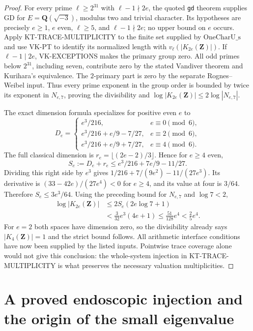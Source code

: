 \documentclass[11pt,a4paper]{article}
\theoremstyle{definition}
\begin{document}
\begin{proof}
For every prime $\ell\geq2^{31}$ with $\ell-1\nmid2e$,
the quoted \texttt{gd} theorem supplies $\mathrm{GD}$ for
$E=\mathbf Q(\sqrt{-3})$, modulus two and trivial character.
Its hypotheses are precisely $e\geq1$, $e$ even,
$\ell\geq5$, and $\ell-1\nmid2e$; no upper bound on $e$
occurs. Apply
KT-TRACE-MULTIPLICITY to the finite set supplied by
$\mathrm{OneCharU\_s}$ and use VK-PT to identify its normalized
length with $v_\ell(|K_{2e}(\mathbf Z)|)$.
If $\ell-1\mid2e$, VK-EXCEPTIONS makes the primary group zero.
All odd primes below $2^{31}$, including seven, contribute zero
by the stated Vandiver theorem and Kurihara's equivalence.
The $2$-primary part is zero by the separate Rognes--Weibel input.
Thus every prime exponent in the group order is bounded by twice
its exponent in $N_{e,7}$, proving the divisibility and
$\log|K_{2e}(\mathbf Z)|\leq2\log|N_{e,7}|$.

The exact dimension formula specializes for positive even $e$ to
\[
D_e=\begin{cases}
e^3/216,&e\equiv0\pmod6,\\
e^3/216+e/9-7/27,&e\equiv2\pmod6,\\
e^3/216+e/9+7/27,&e\equiv4\pmod6.
\end{cases}
\]
The full classical dimension is
$r_e=\lfloor(2e-2)/3\rfloor$.
Hence for $e\geq4$ even,
\[
 S_e:=D_e+r_e\leq e^3/216+7e/9-11/27.
\]
Dividing this right side by $e^3$ gives
$1/216+7/(9e^2)-11/(27e^3)$.
Its derivative is $(33-42e)/(27e^4)<0$ for $e\geq4$,
and its value at four is $3/64$. Therefore $S_e\leq3e^3/64$.
Using the preceding bound for $N_{e,7}$ and $\log7<2$,
\begin{align*}
 \log|K_{2e}(\mathbf Z)|
 &\leq 2S_e(2e\log7+1)\\
 &<\frac3{32}e^3(4e+1)
 \leq\frac{51}{128}e^4<\frac25e^4.
\end{align*}
For $e=2$ both spaces have dimension zero, so the divisibility
already says $|K_4(\mathbf Z)|=1$ and the strict bound follows.
All arithmetic interface conditions have now been supplied by
the listed inputs. Pointwise trace coverage alone would not
give this conclusion: the whole-system injection in
KT-TRACE-MULTIPLICITY is what preserves the necessary
valuation multiplicities.
\end{proof}



\section{A proved endoscopic injection and the origin of the small eigenvalue}
\label{sec:kt-endoscopic}
\end{document}
